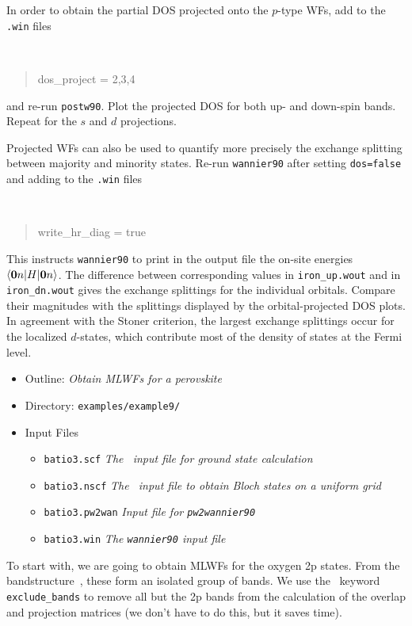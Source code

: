 \documentclass[a4paper,11pt,twoside]{article}
\begin{document}
In order to obtain the partial DOS projected onto the $p$-type WFs,
add to the {\tt .win} files
%
{\tt
\begin{quote}
dos\_project = 2,3,4
\end{quote}
}
%
and re-run {\tt postw90}. Plot the projected DOS for both up- and
down-spin bands. Repeat for the $s$ and $d$ projections. 

Projected WFs can also be used to quantify more precisely the exchange
splitting between majority and minority states. Re-run {\tt wannier90}
after setting {\tt dos=false} and adding to the {\tt .win} files
%
{\tt
\begin{quote}
write\_hr\_diag = true
\end{quote}
}
%
This instructs {\tt wannier90} to print in the output file the on-site
energies $\langle {\bf 0}n\vert H\vert {\bf 0}n\rangle$. The
difference between corresponding values in {\tt iron\_up.wout} and in
{\tt iron\_dn.wout} gives the exchange splittings for the individual
orbitals. Compare their magnitudes with the splittings displayed by
the orbital-projected DOS plots.  In agreement with the Stoner
criterion, the largest exchange splittings occur for the localized
$d$-states, which contribute most of the density of states at the
Fermi level.




\begin{itemize}
\item{Outline: \it{Obtain MLWFs for a perovskite}}
\item{Directory: {\tt examples/example9/}}
\item{Input Files}
\begin{itemize}
\item{ {\tt batio3.scf}  {\it The \pwscf\ input file for ground state
    calculation}} 
\item{ {\tt batio3.nscf}  {\it The \pwscf\ input file to obtain Bloch states
    on a uniform grid}} 
\item{ {\tt batio3.pw2wan}  {\it Input file for {\tt pw2wannier90}}}
\item{ {\tt  batio3.win}  {\it The {\tt wannier90} input file}}
\end{itemize}
\end{itemize}

 To start with, we are going to obtain MLWFs for the oxygen 2p
  states. From the bandstructure~\cite{marzari-arxiv98}, these form an isolated
  group of bands. We use the \wannier\ keyword {\tt exclude\_bands} to
  remove all but the 2p bands from the calculation of the overlap
  and projection matrices (we don't have to do this, but it saves time).
\end{document}
